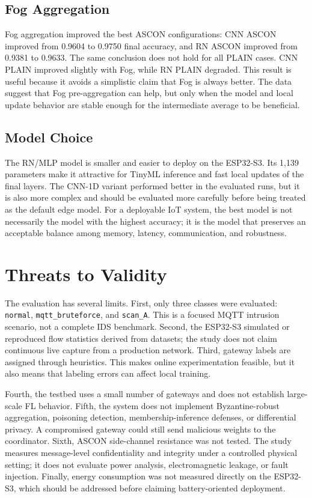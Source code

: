 \documentclass[runningheads]{llncs}
\begin{document}
\subsection{Fog Aggregation}

Fog aggregation improved the best ASCON configurations: CNN ASCON improved from 0.9604 to 0.9750 final accuracy, and RN ASCON improved from 0.9381 to 0.9633. The same conclusion does not hold for all PLAIN cases. CNN PLAIN improved slightly with Fog, while RN PLAIN degraded. This result is useful because it avoids a simplistic claim that Fog is always better. The data suggest that Fog pre-aggregation can help, but only when the model and local update behavior are stable enough for the intermediate average to be beneficial.

\subsection{Model Choice}

The RN/MLP model is smaller and easier to deploy on the ESP32-S3. Its 1,139 parameters make it attractive for TinyML inference and fast local updates of the final layers. The CNN-1D variant performed better in the evaluated runs, but it is also more complex and should be evaluated more carefully before being treated as the default edge model. For a deployable IoT system, the best model is not necessarily the model with the highest accuracy; it is the model that preserves an acceptable balance among memory, latency, communication, and robustness.

\section{Threats to Validity}

The evaluation has several limits. First, only three classes were evaluated: \texttt{normal}, \texttt{mqtt\_bruteforce}, and \texttt{scan\_A}. This is a focused MQTT intrusion scenario, not a complete IDS benchmark. Second, the ESP32-S3 simulated or reproduced flow statistics derived from datasets; the study does not claim continuous live capture from a production network. Third, gateway labels are assigned through heuristics. This makes online experimentation feasible, but it also means that labeling errors can affect local training.

Fourth, the testbed uses a small number of gateways and does not establish large-scale FL behavior. Fifth, the system does not implement Byzantine-robust aggregation, poisoning detection, membership-inference defenses, or differential privacy. A compromised gateway could still send malicious weights to the coordinator. Sixth, ASCON side-channel resistance was not tested. The study measures message-level confidentiality and integrity under a controlled physical setting; it does not evaluate power analysis, electromagnetic leakage, or fault injection. Finally, energy consumption was not measured directly on the ESP32-S3, which should be addressed before claiming battery-oriented deployment.
\end{document}
